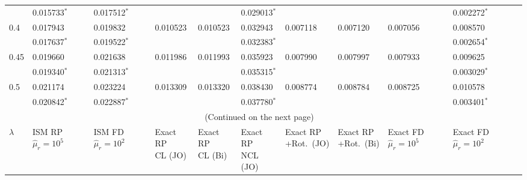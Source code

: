 \documentclass[../thesis.tex]{subfiles}
\begin{document}
\begin{landscape}
\begin{longtable}{lllllllllll}
 \\
 & 0.015733$^*$ & 0.017512$^*$ & & & 0.029013$^*$ & & & & 0.002272$^*$
 \\
 0.4 & 0.017943 & 0.019832 & 0.010523 & 0.010523 & 0.032943 & 0.007118 & 0.007120 & 0.007056 & 0.008570
 \\
 & 0.017637$^*$ & 0.019522$^*$ & & & 0.032383$^*$ & & & & 0.002654$^*$
 \\
 0.45 & 0.019660 & 0.021638 & 0.011986 & 0.011993 & 0.035923 & 0.007990 & 0.007997 & 0.007933 & 0.009625
 \\
 & 0.019340$^*$ & 0.021313$^*$ & & & 0.035315$^*$ & & & & 0.003029$^*$
 \\
 0.5 & 0.021174 & 0.023224 & 0.013309 & 0.013320 & 0.038430 & 0.008774 & 0.008784 & 0.008725 & 0.010578
 \\
  & 0.020842$^*$ & 0.022887$^*$ & & & 0.037780$^*$ & & & & 0.003401$^*$
  
 \\ \hline \multicolumn{10}{c}{(Continued on the next page)}
 \\ \newpage \hline $\lambda$ & \makecell[l]{ISM RP\\$\hat{\mu}_r=10^5$} & \makecell[l]{ISM FD\\$\hat{\mu}_r=10^2$} & \makecell[l]{Exact RP\\CL (JO)} & \makecell[l]{Exact RP\\CL (Bi)} & \makecell[l]{Exact RP\\NCL (JO)} & \makecell[l]{Exact RP\\+Rot.\ (JO)} & \makecell[l]{Exact RP\\+Rot.\ (Bi)} & \makecell[l]{Exact FD\\$\hat{\mu}_r=10^5$} & \makecell[l]{Exact FD\\$\hat{\mu}_r=10^2$}
 \\\hline


\end{longtable}
\end{landscape}
\end{document}
